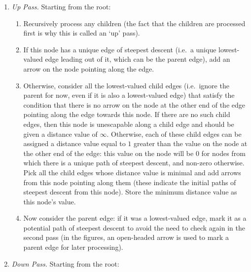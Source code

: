 \documentclass[review,a4paper]{elsarticle}
\begin{document}
\begin{enumerate}

\item \emph{Up Pass.} Starting from the root:

\begin{enumerate}
\item Recursively process any children (the fact that the children are processed first is why this is called an `up' pass).
\item If this node has a unique edge of steepest descent (i.e.~a unique lowest-valued edge leading out of it, which can be the parent edge), add an arrow on the node pointing along the edge.
\item Otherwise, consider all the lowest-valued child edges (i.e.~ignore the parent for now, even if it is also a lowest-valued edge) that satisfy the condition that there is no arrow on the node at the other end of the edge pointing along the edge towards this node. If there are no such child edges, then this node is unescapable along a child edge and should be given a distance value of $\infty$. Otherwise, each of these child edges can be assigned a distance value equal to $1$ greater than the value on the node at the other end of the edge: this value on the node will be $0$ for nodes from which there is a unique path of steepest descent, and non-zero otherwise. Pick all the child edges whose distance value is minimal and add arrows from this node pointing along them (these indicate the initial paths of steepest descent from this node). Store the minimum distance value as this node's value.
\item Now consider the parent edge: if it was a lowest-valued edge, mark it as a potential path of steepest descent to avoid the need to check again in the second pass (in the figures, an open-headed arrow is used to mark a parent edge for later processing).
\end{enumerate}

\item \emph{Down Pass.} Starting from the root:


\end{enumerate}
\end{document}
